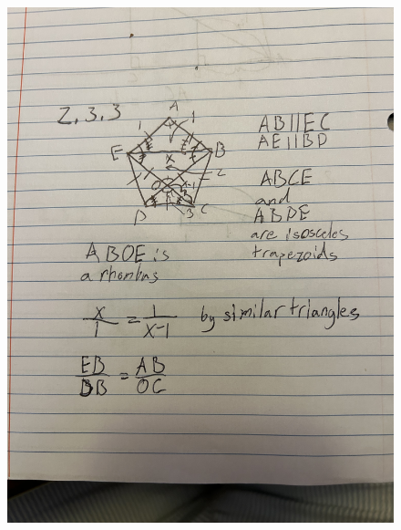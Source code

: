 \documentclass[10pt]{article}
\begin{document}
\begin{enumerate}
\begin{figure}
    \end{figure}
    \begin{figure}
        \includegraphics[scale=0.15]{IMG_0679}
    \end{figure}
    \begin{figure}

\end{figure}
\end{enumerate}
\end{document}
